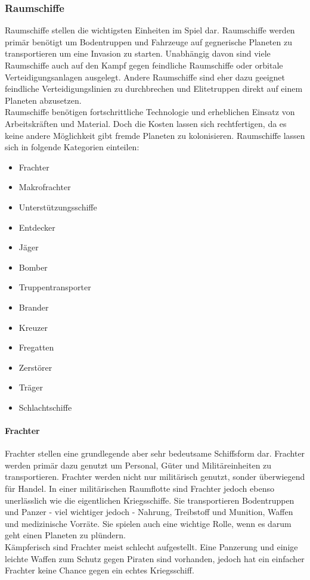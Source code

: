 \documentclass[11pt, a4paper]{article}
\begin{document}
\subsubsection{Raumschiffe}
Raumschiffe stellen die wichtigsten Einheiten im Spiel dar. Raumschiffe werden primär benötigt um Bodentruppen
und Fahrzeuge auf gegnerische Planeten zu transportieren um eine Invasion zu starten. Unabhängig davon sind
viele Raumschiffe auch auf den Kampf gegen feindliche Raumschiffe oder orbitale Verteidigungsanlagen
ausgelegt. Andere Raumschiffe sind eher dazu geeignet feindliche Verteidigungslinien zu durchbrechen und
Elitetruppen direkt auf einem Planeten abzusetzen.\\
Raumschiffe benötigen fortschrittliche Technologie und erheblichen Einsatz von Arbeitskräften und Material.
Doch die Kosten lassen sich rechtfertigen, da es keine andere Möglichkeit gibt fremde Planeten zu kolonisieren.
Raumschiffe lassen sich in folgende Kategorien einteilen:
\begin{itemize}
    \item Frachter
    \item Makrofrachter
    \item Unterstützungsschiffe
    \item Entdecker
    \item Jäger
    \item Bomber
    \item Truppentransporter
    \item Brander
    \item Kreuzer
    \item Fregatten
    \item Zerstörer
    \item Träger
    \item Schlachtschiffe
\end{itemize}
%
\paragraph{Frachter}
Frachter stellen eine grundlegende aber sehr bedeutsame Schiffsform dar. Frachter werden primär dazu genutzt
um Personal, Güter und Militäreinheiten zu transportieren. Frachter werden nicht nur militärisch genutzt,
sonder überwiegend für Handel. In einer militärischen Raumflotte sind Frachter jedoch ebenso unerlässlich wie
die eigentlichen Kriegsschiffe. Sie transportieren Bodentruppen und Panzer - viel wichtiger jedoch -
Nahrung, Treibstoff und Munition, Waffen und medizinische Vorräte. Sie spielen auch eine wichtige Rolle, wenn
es darum geht einen Planeten zu plündern.\\
Kämpferisch sind Frachter meist schlecht aufgestellt. Eine Panzerung und einige leichte Waffen zum Schutz
gegen Piraten sind vorhanden, jedoch hat ein einfacher Frachter keine Chance gegen ein echtes Kriegsschiff.
%
\end{document}
